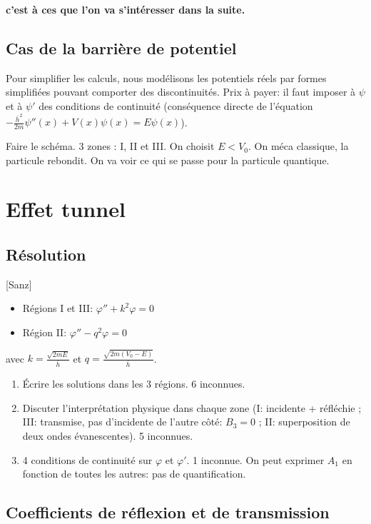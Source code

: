 \documentclass[11pt]{report}
\numberwithin{figure}{section}
\numberwithin{equation}{section}
\numberwithin{table}{section}
\newcommand{\1}{\boldsymbol{1}}
\begin{document}
\textbf{c'est à ces que l'on va s'intéresser dans la suite.}

\subsection{Cas de la barrière de potentiel}

Pour simplifier les calculs, nous modélisons les potentiels réels par formes simplifiées pouvant comporter des discontinuités. Prix à payer: il faut imposer à $\psi$ et à $\psi'$ des conditions de continuité (conséquence directe de l'équation $- \frac{\bar{h}^2}{2m} \psi''(x) + V(x) \psi(x) = E \psi(x)$).

Faire le schéma. 3 zones : I, II et III. On choisit $E < V_0$. On méca classique, la particule rebondit. On va voir ce qui se passe pour la particule quantique.

\section{Effet tunnel}

\subsection{Résolution}

[Sanz] 
\begin{itemize}
\item Régions I et III: $\varphi'' + k^2 \varphi = 0$
\item Région II: $\varphi'' - q^2 \varphi = 0$
\end{itemize}
avec $k = \frac{\sqrt{2mE}}{\bar{h}}$ et $q = \frac{\sqrt{2m(V_0 - E)}}{\bar{h}}$.

\begin{enumerate}
\item Écrire les solutions dans les 3 régions. 6 inconnues.
\item Discuter l'interprétation physique dans chaque zone (I: incidente + réfléchie ; III: transmise, pas d'incidente de l'autre côté: $B_3 = 0$ ; II: superposition de deux ondes évanescentes). 5 inconnues.
\item 4 conditions de continuité sur $\varphi$ et $\varphi'$. 1 inconnue. On peut exprimer $A_1$ en fonction de toutes les autres: pas de quantification.
\end{enumerate}

\subsection{Coefficients de réflexion et de transmission}
\end{document}
